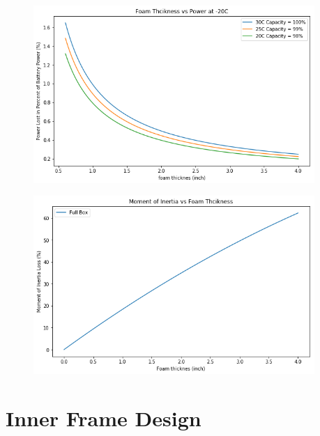 \begin{figure}
    \begin{small}
        \begin{center}
            \includegraphics[width=0.95\textwidth]{Hardware/figs/battery_power_loss.png}
        \end{center}
        \caption{}
        \label{fig:}
    \end{small}
\end{figure}


\begin{figure}
    \begin{small}
        \begin{center}
            \includegraphics[width=0.95\textwidth]{Hardware/figs/battery_inertia_loss.png}
        \end{center}
        \caption{}
        \label{fig:}
    \end{small}
\end{figure}



\section{Inner Frame Design}


